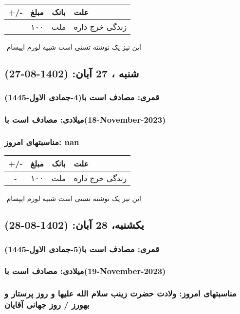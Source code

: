 \documentclass{article}
\newcommand{\rnote}[1]{\marginpar{\textcolor{color}{\StrSubstitute{\##1}{ }{\_}}}}
\newcommand{\myRow}[4]{
    #1 & #2 & #3 & #4 \\ \hline
}
\begin{document}
\begin{tabular}{ | c | c | c | p{5cm} |}
    \hline
    \myRow{ +/- }{مبلغ}{بانک}{علت}
    \myRow{-}{۱۰۰}{ملت}{زندگی خرج داره}
\end{tabular}
\newline
\newline

‌
\rnote{تست}
این نیز یک نوشته تستی است شبیه لورم ایپسام




\newpage
{}
\textcolor{color}{
\section{ شنبه ، 27 آبان: (1402-08-27) }
\subsubsection*{قمری: مصادف است با(4-جمادی الاول-1445)} 
\subsubsection*{میلادی: مصادف است با(18-November-2023)}
\subsubsection*{مناسبتهای امروز: nan}
}


\begin{tabular}{ | c | c | c | p{5cm} |}
    \hline
    \myRow{ +/- }{مبلغ}{بانک}{علت}
    \myRow{-}{۱۰۰}{ملت}{زندگی خرج داره}
\end{tabular}
\newline
\newline

‌
\rnote{تست}
این نیز یک نوشته تستی است شبیه لورم ایپسام




\newpage
{}
\textcolor{color}{
\section{ یکشنبه، 28 آبان: (1402-08-28) }
\subsubsection*{قمری: مصادف است با(5-جمادی الاول-1445)} 
\subsubsection*{میلادی: مصادف است با(19-November-2023)}
\subsubsection*{مناسبتهای امروز: ولادت حضرت زینب سلام الله علیها و روز پرستار و بهورز / روز جهانی آقایان}
}
\end{document}
